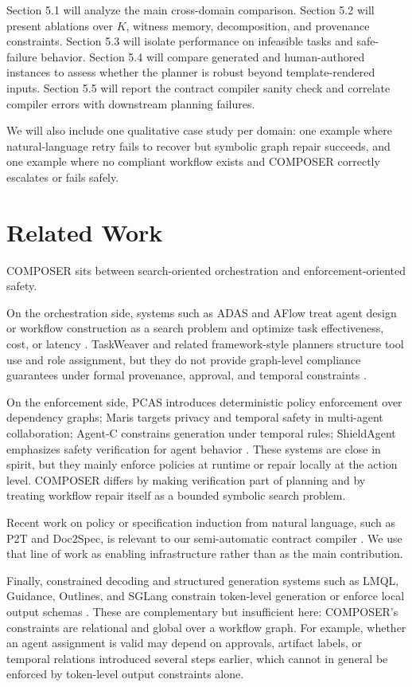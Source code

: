 \documentclass[11pt]{article}
\begin{document}
Section 5.1 will analyze the main cross-domain comparison. Section 5.2 will present ablations over $K$, witness memory, decomposition, and provenance constraints. Section 5.3 will isolate performance on infeasible tasks and safe-failure behavior. Section 5.4 will compare generated and human-authored instances to assess whether the planner is robust beyond template-rendered inputs. Section 5.5 will report the contract compiler sanity check and correlate compiler errors with downstream planning failures.

We will also include one qualitative case study per domain: one example where natural-language retry fails to recover but symbolic graph repair succeeds, and one example where no compliant workflow exists and COMPOSER correctly escalates or fails safely.

\section{Related Work}
COMPOSER sits between search-oriented orchestration and enforcement-oriented safety.

On the orchestration side, systems such as ADAS and AFlow treat agent design or workflow construction as a search problem and optimize task effectiveness, cost, or latency \citep{ADAS,AFlow}. TaskWeaver and related framework-style planners structure tool use and role assignment, but they do not provide graph-level compliance guarantees under formal provenance, approval, and temporal constraints \citep{TaskWeaver}.

On the enforcement side, PCAS introduces deterministic policy enforcement over dependency graphs; Maris targets privacy and temporal safety in multi-agent collaboration; Agent-C constrains generation under temporal rules; ShieldAgent emphasizes safety verification for agent behavior \citep{PCAS,Maris,Agent-C,ShieldAgent}. These systems are close in spirit, but they mainly enforce policies at runtime or repair locally at the action level. COMPOSER differs by making verification part of planning and by treating workflow repair itself as a bounded symbolic search problem.

Recent work on policy or specification induction from natural language, such as P2T and Doc2Spec, is relevant to our semi-automatic contract compiler \citep{P2T,Doc2Spec}. We use that line of work as enabling infrastructure rather than as the main contribution.

Finally, constrained decoding and structured generation systems such as LMQL, Guidance, Outlines, and SGLang constrain token-level generation or enforce local output schemas \citep{LMQL,Guidance,Outlines,SGLang}. These are complementary but insufficient here: COMPOSER's constraints are relational and global over a workflow graph. For example, whether an agent assignment is valid may depend on approvals, artifact labels, or temporal relations introduced several steps earlier, which cannot in general be enforced by token-level output constraints alone.
\end{document}
